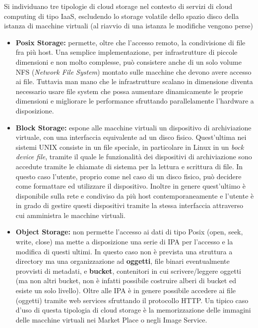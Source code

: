 \documentclass[italian,]{article}
\providecommand{\tightlist}{%
  \setlength{\itemsep}{0pt}\setlength{\parskip}{0pt}}
\begin{document}
Si individuano tre tipologie di cloud storage nel contesto di servizi di
cloud computing di tipo IaaS, escludendo lo storage volatile dello
spazio disco della istanza di macchine virtuali (al riavvio di una
istanza le modifiche vengono perse)

\begin{itemize}
\tightlist
\item
  \textbf{Posix Storage:} permette, oltre che l'accesso remoto, la
  condivisione di file fra più host. Una semplice implementazione, per
  infrastrutture di piccole dimensioni e non molto complesse, può
  consistere anche di un solo volume NFS (\emph{Network File System})
  montato sulle macchine che devono avere accesso ai file. Tuttavia man
  mano che le infrastrutture scalano in dimensione diventa necessario
  usare file system che possa aumentare dinamicamente le proprie
  dimensioni e migliorare le performance sfruttando parallelamente
  l'hardware a disposizione.
\item
  \textbf{Block Storage:} espone alle macchine virtuali un dispositivo
  di archiviazione virtuale, con una interfaccia equivalente ad un disco
  fisico. Quest'ultima nei sistemi UNIX consiste in un file speciale, in
  particolare in Linux in un \emph{bock device file}, tramite il quale
  le funzionalità dei dispositivi di archiviazione sono accedute tramite
  le chiamate di sistema per la lettura e scrittura di file. In questo
  caso l'utente, proprio come nel caso di un disco fisico, può decidere
  come formattare ed utilizzare il dispositivo. Inoltre in genere
  quest'ultimo è disponibile sulla rete e condiviso da più host
  contemporaneamente e l'utente è in grado di gestire questi dispositivi
  tramite la stessa interfaccia attraverso cui amministra le macchine
  virtuali.
\item
  \textbf{Object Storage:} non permette l'accesso ai dati di tipo Posix
  (open, seek, write, close) ma mette a disposizione una serie di IPA
  per l'accesso e la modifica di questi ultimi. In questo caso non è
  prevista una struttura a directory ma una organizzazione ad
  \textbf{oggetti}, file binari eventualmente provvisti di metadati, e
  \textbf{bucket}, contenitori in cui scrivere/leggere oggetti (ma non
  altri bucket, non è infatti possibile costruire alberi di bucket ed
  esiste un solo livello). Oltre alle IPA è in genere possibile accedere
  ai file (oggetti) tramite web services sfruttando il protocollo HTTP.
  Un tipico caso d'uso di questa tipologia di cloud storage è la
  memorizzazione delle immagini delle macchine virtuali nei Market Place
  o negli Image Service.
\end{itemize}
\end{document}
